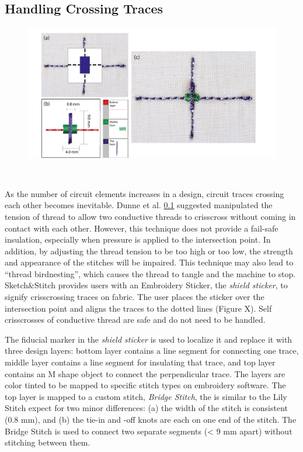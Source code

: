 \documentclass[header.tex]{subfiles}
\begin{document}




\subsection{Handling Crossing Traces}
\begin{figure}
\centering
  \includegraphics[width=0.7\columnwidth]{figures/BridgeStitch}
  \caption{}~\label{fig:BridgeStitch}
  \vspace{-2.5em}
\end{figure}
As the number of circuit elements increases in a design, circuit traces crossing each other becomes inevitable. Dunne et al. \ref{} suggested manipulated the tension of thread to allow two conductive threads to crisscross without coming in contact with each other. However, this technique does not provide a fail-safe insulation, especially when pressure is applied to the intersection point. In addition, by adjusting the thread tension to be too high or too low, the strength and appearance of the stitches will be impaired. This technique may also lead to ``thread birdnesting'', which causes the thread to tangle and the machine to stop.  
Sketch\&Stitch provides users with an Embroidery Sticker, the \textit{shield sticker}, to signify crisscrossing traces on fabric. The user places the sticker over the intersection point and aligns the traces to the dotted lines (Figure X). Self crisscrosses of conductive thread are safe and do not need to be handled.


The fiducial marker in the \textit{shield sticker} is used to localize it and replace it with three design layers: bottom layer contains a line segment for connecting one trace, middle layer contains a line segment for insulating that trace, and top layer contains an M shape object to connect the perpendicular trace. The layers are color tinted to be mapped to specific stitch types on embroidery software. The top layer is mapped to a custom stitch, \textit{Bridge Stitch}, the is similar to the Lily Stitch expect for two minor differences: (a) the width of the stitch is consistent (0.8 mm), and (b) the tie-in and -off knots are each on one end of the stitch. The Bridge Stitch is used to connect two separate segments (< 9 mm apart) without stitching between them. 
\end{document}
